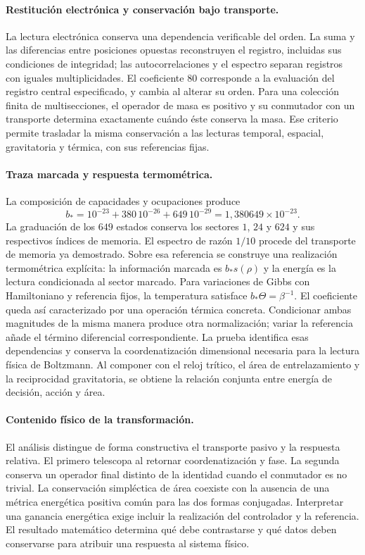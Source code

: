 \paragraph{Restitución electrónica y conservación bajo transporte.}
La lectura electrónica conserva una dependencia verificable del orden.
La suma y las diferencias entre posiciones opuestas reconstruyen el
registro, incluidas sus condiciones de integridad; las autocorrelaciones
y el espectro separan registros con iguales multiplicidades. El
coeficiente $80$ corresponde a la evaluación del registro central
especificado, y cambia al alterar su orden. Para una colección finita
de multisecciones, el operador de masa es positivo y su conmutador
con un transporte determina exactamente cuándo éste conserva la masa.
Ese criterio permite trasladar la misma conservación a las lecturas
temporal, espacial, gravitatoria y térmica, con sus referencias fijas.

\newpage
\paragraph{Traza marcada y respuesta termométrica.}
La composición de capacidades y ocupaciones produce
\[
 b_*=10^{-23}+380\,10^{-26}+649\,10^{-29}
     =1{,}380649\times10^{-23}.
\]
La graduación de los $649$ estados conserva los sectores $1$, $24$
y $624$ y sus respectivos índices de memoria. El espectro de razón
$1/10$ procede del transporte de memoria ya demostrado. Sobre esa
referencia se construye una realización termométrica explícita:
la información marcada es $b_*s(\rho)$ y la energía es la lectura
condicionada al sector marcado. Para variaciones de Gibbs con
Hamiltoniano y referencia fijos, la temperatura satisface
$b_*\Theta=\beta^{-1}$. El coeficiente queda así caracterizado por
una operación térmica concreta. Condicionar ambas magnitudes de la
misma manera produce otra normalización; variar la referencia añade
el término diferencial correspondiente. La prueba identifica esas
dependencias y conserva la coordenatización dimensional necesaria para la
lectura física de Boltzmann. Al componer con el reloj trítico, el
área de entrelazamiento y la reciprocidad gravitatoria, se obtiene
la relación conjunta entre energía de decisión, acción y área.

\paragraph{Contenido físico de la transformación.}
El análisis distingue de forma constructiva el transporte
pasivo y la respuesta relativa. El primero telescopa al retornar coordenatización
y fase. La segunda conserva un operador final distinto de la identidad
cuando el conmutador es no trivial. La conservación simpléctica de área
coexiste con la ausencia de una métrica energética positiva común para
las dos formas conjugadas. Interpretar una ganancia energética exige
incluir la realización del controlador y la referencia. El resultado
matemático determina qué debe contrastarse y qué datos deben conservarse
para atribuir una respuesta al sistema físico.


